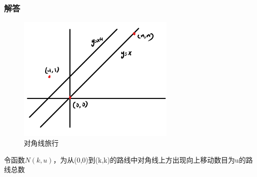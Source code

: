\documentclass[12pt, a4paper]{article}
\begin{document}
\subsubsection{解答}
\begin{figure}[htbp]
    \centering
    \includegraphics[width=3in]{../resource/diagonal.png}
    \caption{对角线旅行}
\end{figure}
令函数$N(k,u)$，为从(0,0)到(k,k)的路线中对角线上方出现向上移动数目为u的路线总数
\end{document}
